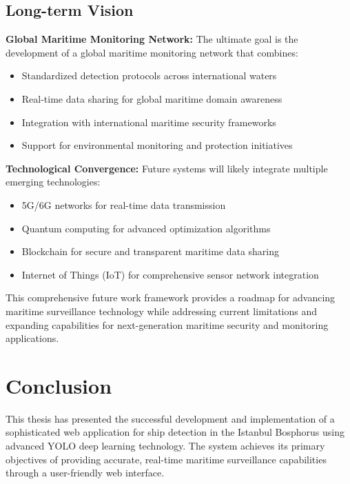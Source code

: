 \documentclass[a4paper,11pt]{article}
\begin{document}
\subsection{Long-term Vision}

\textbf{Global Maritime Monitoring Network:}
The ultimate goal is the development of a global maritime monitoring network that combines:
\begin{itemize}
    \item Standardized detection protocols across international waters
    \item Real-time data sharing for global maritime domain awareness
    \item Integration with international maritime security frameworks
    \item Support for environmental monitoring and protection initiatives
\end{itemize}

\textbf{Technological Convergence:}
Future systems will likely integrate multiple emerging technologies:
\begin{itemize}
    \item 5G/6G networks for real-time data transmission
    \item Quantum computing for advanced optimization algorithms
    \item Blockchain for secure and transparent maritime data sharing
    \item Internet of Things (IoT) for comprehensive sensor network integration
\end{itemize}

This comprehensive future work framework provides a roadmap for advancing maritime surveillance technology while addressing current limitations and expanding capabilities for next-generation maritime security and monitoring applications.

\section{Conclusion}

This thesis has presented the successful development and implementation of a sophisticated web application for ship detection in the Istanbul Bosphorus using advanced YOLO deep learning technology. The system achieves its primary objectives of providing accurate, real-time maritime surveillance capabilities through a user-friendly web interface.
\end{document}
